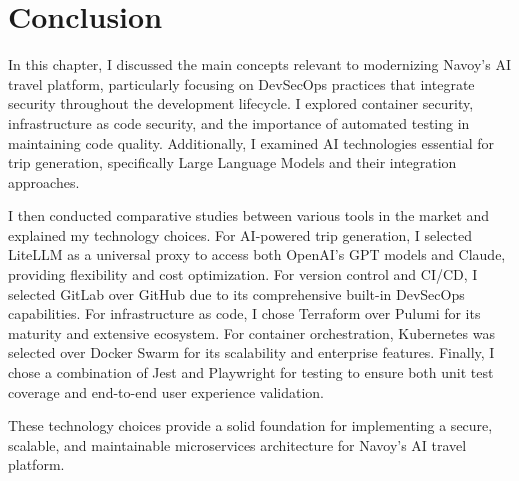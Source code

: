 \section{Conclusion}
In this chapter, I discussed the main concepts relevant to modernizing Navoy's AI travel platform, particularly focusing on DevSecOps practices that integrate security throughout the development lifecycle. I explored container security, infrastructure as code security, and the importance of automated testing in maintaining code quality. Additionally, I examined AI technologies essential for trip generation, specifically Large Language Models and their integration approaches.

I then conducted comparative studies between various tools in the market and explained my technology choices. For AI-powered trip generation, I selected LiteLLM as a universal proxy to access both OpenAI's GPT models and Claude, providing flexibility and cost optimization. For version control and CI/CD, I selected GitLab over GitHub due to its comprehensive built-in DevSecOps capabilities. For infrastructure as code, I chose Terraform over Pulumi for its maturity and extensive ecosystem. For container orchestration, Kubernetes was selected over Docker Swarm for its scalability and enterprise features. Finally, I chose a combination of Jest and Playwright for testing to ensure both unit test coverage and end-to-end user experience validation.

These technology choices provide a solid foundation for implementing a secure, scalable, and maintainable microservices architecture for Navoy's AI travel platform.
